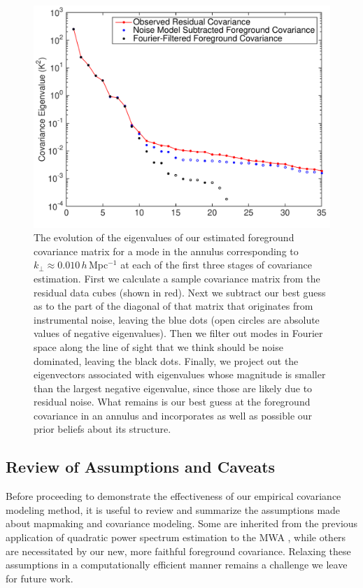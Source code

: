 \begin{figure}[]  
	\centering 
	\includegraphics[width=.48\textwidth]{chap4_empirical_covariance/eigenvalue_stages.pdf}
	\caption[The evolution of the eigenvalues of our estimated foreground covariance matrix for a mode in the annulus corresponding to $k_\perp \approx 0.010$\,$h$\,Mpc$^{-1}$.]{The evolution of the eigenvalues of our estimated foreground covariance matrix for a mode in the annulus corresponding to $k_\perp \approx 0.010$\,$h$\,Mpc$^{-1}$ at each of the first three stages of covariance estimation. First we calculate a sample covariance matrix from the residual data cubes (shown in red). Next we subtract our best guess as to the part of the diagonal of that matrix that originates from instrumental noise, leaving the blue dots (open circles are absolute values of negative eigenvalues). Then we filter out modes in Fourier space along the line of sight that we think should be noise dominated, leaving the black dots. Finally, we project out the eigenvectors associated with eigenvalues whose magnitude is smaller than the largest negative eigenvalue, since those are likely due to residual noise. What remains is our best guess at the foreground covariance in an annulus and incorporates as well as possible our prior beliefs about its structure.}
	\label{fig:cov_steps}
\end{figure}  


\subsection{Review of Assumptions and Caveats} \label{sec:caveats}

Before proceeding to demonstrate the effectiveness of our empirical covariance modeling method, it is useful to review and summarize the assumptions made about mapmaking and covariance modeling. Some are inherited from the previous application of quadratic power spectrum estimation to the MWA \cite{X13}, while others are necessitated by our new, more faithful foreground covariance. Relaxing these assumptions in a computationally efficient manner remains a challenge we leave for future work.

